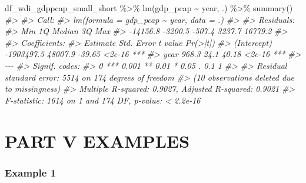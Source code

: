 \documentclass[
]{bxjsbook}
\newenvironment{Shaded}{\begin{snugshade}}{\end{snugshade}}
\newcommand{\CommentTok}[1]{\textcolor[rgb]{0.56,0.35,0.01}{\textit{#1}}}
\newcommand{\FunctionTok}[1]{\textcolor[rgb]{0.00,0.00,0.00}{#1}}
\newcommand{\NormalTok}[1]{#1}
\newcommand{\SpecialCharTok}[1]{\textcolor[rgb]{0.00,0.00,0.00}{#1}}
\theoremstyle{definition}
\theoremstyle{definition}
\theoremstyle{definition}
\theoremstyle{definition}
\theoremstyle{remark}
\begin{document}
\begin{Shaded}
\begin{Highlighting}[]
\NormalTok{df\_wdi\_gdppcap\_small\_short }\SpecialCharTok{\%\textgreater{}\%} \FunctionTok{lm}\NormalTok{(gdp\_pcap }\SpecialCharTok{\textasciitilde{}}\NormalTok{ year, .) }\SpecialCharTok{\%\textgreater{}\%} \FunctionTok{summary}\NormalTok{()}
\CommentTok{\#\textgreater{} }
\CommentTok{\#\textgreater{} Call:}
\CommentTok{\#\textgreater{} lm(formula = gdp\_pcap \textasciitilde{} year, data = .)}
\CommentTok{\#\textgreater{} }
\CommentTok{\#\textgreater{} Residuals:}
\CommentTok{\#\textgreater{}      Min       1Q   Median       3Q      Max }
\CommentTok{\#\textgreater{} {-}14156.8  {-}3200.5   {-}507.4   3237.7  16779.2 }
\CommentTok{\#\textgreater{} }
\CommentTok{\#\textgreater{} Coefficients:}
\CommentTok{\#\textgreater{}               Estimate Std. Error t value Pr(\textgreater{}|t|)    }
\CommentTok{\#\textgreater{} (Intercept) {-}1903497.5    48007.9  {-}39.65   \textless{}2e{-}16 ***}
\CommentTok{\#\textgreater{} year             968.3       24.1   40.18   \textless{}2e{-}16 ***}
\CommentTok{\#\textgreater{} {-}{-}{-}}
\CommentTok{\#\textgreater{} Signif. codes:  }
\CommentTok{\#\textgreater{} 0 \textquotesingle{}***\textquotesingle{} 0.001 \textquotesingle{}**\textquotesingle{} 0.01 \textquotesingle{}*\textquotesingle{} 0.05 \textquotesingle{}.\textquotesingle{} 0.1 \textquotesingle{} \textquotesingle{} 1}
\CommentTok{\#\textgreater{} }
\CommentTok{\#\textgreater{} Residual standard error: 5514 on 174 degrees of freedom}
\CommentTok{\#\textgreater{}   (10 observations deleted due to missingness)}
\CommentTok{\#\textgreater{} Multiple R{-}squared:  0.9027, Adjusted R{-}squared:  0.9021 }
\CommentTok{\#\textgreater{} F{-}statistic:  1614 on 1 and 174 DF,  p{-}value: \textless{} 2.2e{-}16}
\end{Highlighting}
\end{Shaded}

\hypertarget{part-part-v-examples}{%
\part{PART V EXAMPLES}\label{part-part-v-examples}}

\hypertarget{example1}{%
\section{Example 1}\label{example1}}

\hypertarget{appendix-appendix}{%
\appendix}
\end{document}
